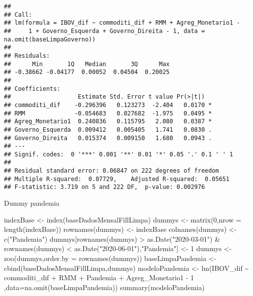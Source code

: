 \documentclass[
]{article}
\newenvironment{Shaded}{\begin{snugshade}}{\end{snugshade}}
\newcommand{\AttributeTok}[1]{\textcolor[rgb]{0.77,0.63,0.00}{#1}}
\newcommand{\DecValTok}[1]{\textcolor[rgb]{0.00,0.00,0.81}{#1}}
\newcommand{\FunctionTok}[1]{\textcolor[rgb]{0.00,0.00,0.00}{#1}}
\newcommand{\NormalTok}[1]{#1}
\newcommand{\OtherTok}[1]{\textcolor[rgb]{0.56,0.35,0.01}{#1}}
\newcommand{\SpecialCharTok}[1]{\textcolor[rgb]{0.00,0.00,0.00}{#1}}
\newcommand{\StringTok}[1]{\textcolor[rgb]{0.31,0.60,0.02}{#1}}
\begin{document}
\begin{verbatim}
## 
## Call:
## lm(formula = IBOV_dif ~ commoditi_dif + RMM + Agreg_Monetario1 - 
##     1 + Governo_Esquerda + Governo_Direita - 1, data = na.omit(baseLimpaGoverno))
## 
## Residuals:
##      Min       1Q   Median       3Q      Max 
## -0.38662 -0.04177  0.00052  0.04504  0.20025 
## 
## Coefficients:
##                   Estimate Std. Error t value Pr(>|t|)  
## commoditi_dif    -0.296396   0.123273  -2.404   0.0170 *
## RMM              -0.054683   0.027682  -1.975   0.0495 *
## Agreg_Monetario1  0.240836   0.115795   2.080   0.0387 *
## Governo_Esquerda  0.009412   0.005405   1.741   0.0830 .
## Governo_Direita   0.015374   0.009150   1.680   0.0943 .
## ---
## Signif. codes:  0 '***' 0.001 '**' 0.01 '*' 0.05 '.' 0.1 ' ' 1
## 
## Residual standard error: 0.06847 on 222 degrees of freedom
## Multiple R-squared:  0.07729,    Adjusted R-squared:  0.05651 
## F-statistic: 3.719 on 5 and 222 DF,  p-value: 0.002976
\end{verbatim}

Dummy pandemia

\begin{Shaded}
\begin{Highlighting}[]
\NormalTok{indexBase }\OtherTok{\textless{}{-}} \FunctionTok{index}\NormalTok{(baseDadosMensalFillLimpa)}
\NormalTok{dummys }\OtherTok{\textless{}{-}} \FunctionTok{matrix}\NormalTok{(}\DecValTok{0}\NormalTok{,}\AttributeTok{nrow =} \FunctionTok{length}\NormalTok{(indexBase))}
\FunctionTok{rownames}\NormalTok{(dummys) }\OtherTok{\textless{}{-}}\NormalTok{ indexBase}
\FunctionTok{colnames}\NormalTok{(dummys) }\OtherTok{\textless{}{-}} \FunctionTok{c}\NormalTok{(}\StringTok{"Pandemia"}\NormalTok{)}
\NormalTok{dummys[}\FunctionTok{rownames}\NormalTok{(dummys) }\SpecialCharTok{\textgreater{}} \FunctionTok{as.Date}\NormalTok{(}\StringTok{"2020{-}03{-}01"}\NormalTok{) }\SpecialCharTok{\&} \FunctionTok{rownames}\NormalTok{(dummys) }\SpecialCharTok{\textless{}} \FunctionTok{as.Date}\NormalTok{(}\StringTok{"2020{-}06{-}01"}\NormalTok{),}\StringTok{"Pandemia"}\NormalTok{] }\OtherTok{\textless{}{-}} \DecValTok{1}
\NormalTok{dummys }\OtherTok{\textless{}{-}} \FunctionTok{zoo}\NormalTok{(dummys,}\AttributeTok{order.by =} \FunctionTok{rownames}\NormalTok{(dummys))}
\NormalTok{baseLimpaPandemia }\OtherTok{\textless{}{-}} \FunctionTok{cbind}\NormalTok{(baseDadosMensalFillLimpa,dummys)}
\NormalTok{modeloPandemia }\OtherTok{\textless{}{-}} \FunctionTok{lm}\NormalTok{(IBOV\_dif }\SpecialCharTok{\textasciitilde{}}\NormalTok{ commoditi\_dif }\SpecialCharTok{+}\NormalTok{ RMM }\SpecialCharTok{+}\NormalTok{ Pandemia }\SpecialCharTok{+}\NormalTok{ Agreg\_Monetario1 }\SpecialCharTok{{-}} \DecValTok{1}
\NormalTok{  ,}\AttributeTok{data=}\FunctionTok{na.omit}\NormalTok{(baseLimpaPandemia))}
\FunctionTok{summary}\NormalTok{(modeloPandemia)}
\end{Highlighting}
\end{Shaded}
\end{document}
